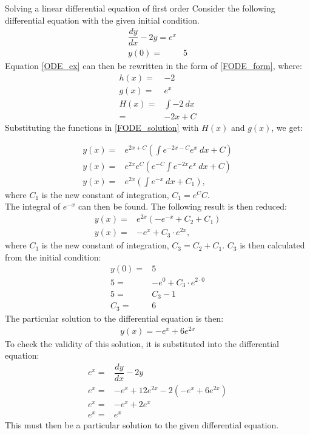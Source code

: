 \begin{example}{Solving a linear differential equation of first order}{}
Consider the following differential equation with the given initial condition.
\begin{align}
	\dfrac{dy}{dx}-2y=e^x  \label{ODE_ex}\\ 
	y(0) =& 5 \nonumber
\end{align}
Equation \eqref{ODE_ex} can then be rewritten in the form of \eqref{FODE_form}, where:
\begin{align*}
	h(x) =& -2 \\
	g(x) =& e^x \\
	H(x) =& \int{-2 \ dx} \\
	     =& -2x + C
\end{align*}
Substituting the functions in \eqref{FODE_solution} with $H(x)$ and $g(x)$, we get: 


\begin{align*}
	y(x)=&e^{2x+C}(\int{e^{-2x-C}e^x\ dx}+C) \\
	y(x)=&e^{2x}e^{C}(e^{-C}\int{e^{-2x}e^{x}\ dx}+C) \\
	y(x)=&e^{2x}(\int{e^{-x}\ dx}+C_{1}),
\end{align*}
where $C_{1}$ is the new constant of integration, $C_1=e^{C}C$. \\
The integral of $e^{-x}$ can then be found. The following result is then reduced:
\begin{align*}
	y(x)=&e^{2x}(-e^{-x}+C_{2}+C_{1}) \\
	y(x)=&-e^x+C_{3} \cdot e^{2x},
\end{align*}
where $C_{3}$ is the new constant of integration, $C_{3}=C_{2}+C_{1}$. $C_{3}$ is then calculated from the initial condition:
\begin{align*}
	y(0)=&5 \\
	5=&-e^0+C_{3} \cdot e^{2 \cdot 0} \\
	5 =& C_{3}-1 \\
	C_{3} =& 6
\end{align*}
The particular solution to the differential equation is then:
\begin{align*}
	y(x) = -e^x+6e^{2x}
\end{align*}
To check the validity of this solution, it is substituted into the differential equation:
\begin{align*}
	e^x =& \dfrac{dy}{dx} -2y \\
	e^x =& -e^x+12e^{2x} -2(-e^x+6e^{2x})  \\
	e^x =& -e^x+2e^x  \\
	e^x =& e^x
\end{align*}
This must then be a particular solution to the given differential equation.
\end{example}

